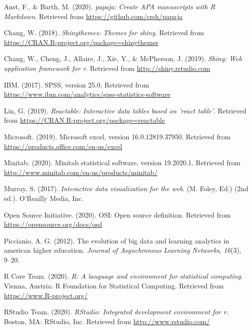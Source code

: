 \documentclass[english,man,floatsintext]{apa6}
\begin{document}
\begingroup
\setlength{\parindent}{-0.5in}
\setlength{\leftskip}{0.5in}

\hypertarget{refs}{}
\leavevmode\hypertarget{ref-R-papaja}{}%
Aust, F., \& Barth, M. (2020). \emph{papaja: Create APA manuscripts with R Markdown}. Retrieved from \url{https://github.com/crsh/papaja}

\leavevmode\hypertarget{ref-R-shinythemes}{}%
Chang, W. (2018). \emph{Shinythemes: Themes for shiny}. Retrieved from \url{https://CRAN.R-project.org/package=shinythemes}

\leavevmode\hypertarget{ref-R-shiny}{}%
Chang, W., Cheng, J., Allaire, J., Xie, Y., \& McPherson, J. (2019). \emph{Shiny: Web application framework for r}. Retrieved from \url{http://shiny.rstudio.com}

\leavevmode\hypertarget{ref-spss}{}%
IBM. (2017). SPSS, version 25.0. Retrieved from \url{https://www.ibm.com/analytics/spss-statistics-software}

\leavevmode\hypertarget{ref-R-reactable}{}%
Lin, G. (2019). \emph{Reactable: Interactive data tables based on 'react table'}. Retrieved from \url{https://CRAN.R-project.org/package=reactable}

\leavevmode\hypertarget{ref-excel}{}%
Microsoft. (2019). Microsoft excel, version 16.0.12819.37950. Retrieved from \url{https://products.office.com/en-us/excel}

\leavevmode\hypertarget{ref-minitab}{}%
Minitab. (2020). Minitab statistical software, version 19.2020.1. Retrieved from \url{http://www.minitab.com/en-us/products/minitab/}

\leavevmode\hypertarget{ref-datavis1}{}%
Murray, S. (2017). \emph{Interactive data visualization for the web}. (M. Foley, Ed.) (2nd ed.). O'Reailly Media, Inc.

\leavevmode\hypertarget{ref-osd}{}%
Open Source Initiative. (2020). OSI: Open source definition. Retrieved from \url{https://opensource.org/docs/osd}

\leavevmode\hypertarget{ref-bigdata1}{}%
Piccianio, A. G. (2012). The evolution of big data and learning analytics in american higher education. \emph{Journal of Asynchronous Learning Networks}, \emph{16}(3), 9--20.

\leavevmode\hypertarget{ref-R-base}{}%
R Core Team. (2020). \emph{R: A language and environment for statistical computing}. Vienna, Austria: R Foundation for Statistical Computing. Retrieved from \url{https://www.R-project.org/}

\leavevmode\hypertarget{ref-rstudio}{}%
RStudio Team. (2020). \emph{RStudio: Integrated development environment for r}. Boston, MA: RStudio, Inc. Retrieved from \url{http://www.rstudio.com/}
\end{document}
